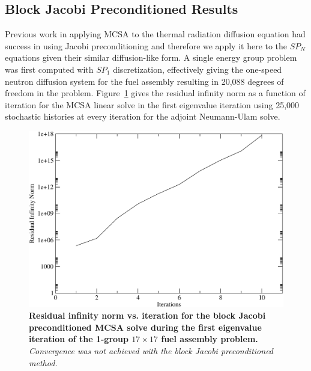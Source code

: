 \documentclass[letterpaper,12pt]{article}
\begin{document}
\subsection{Block Jacobi Preconditioned Results}
\label{subsec:jacobi_prec_assembly_calc}
Previous work in applying MCSA to the thermal radiation diffusion
equation had success in using Jacobi preconditioning
\cite{evans_monte_2012} and therefore we apply it here to the $SP_N$
equations given their similar diffusion-like form. A single energy
group problem was first computed with $SP_1$ discretization,
effectively giving the one-speed neutron diffusion system for the fuel
assembly resulting in 20,088 degrees of freedom in the
problem. Figure~\ref{fig:block_jacobi_res_mcsa} gives the residual
infinity norm as a function of iteration for the MCSA linear solve in
the first eigenvalue iteration using 25,000 stochastic histories at
every iteration for the adjoint Neumann-Ulam solve.

\begin{figure}[t!]
  \begin{center}
    \includegraphics[width=5in]{block_jacobi_res.pdf}
  \end{center}
  \caption{\textbf{Residual infinity norm vs. iteration for the block
      Jacobi preconditioned MCSA solve during the first eigenvalue
      iteration of the 1-group $17 \times 17$ fuel assembly problem.}
    \textit{Convergence was not achieved with the block Jacobi
      preconditioned method.}}
  \label{fig:block_jacobi_res_mcsa}
\end{figure}
\end{document}
